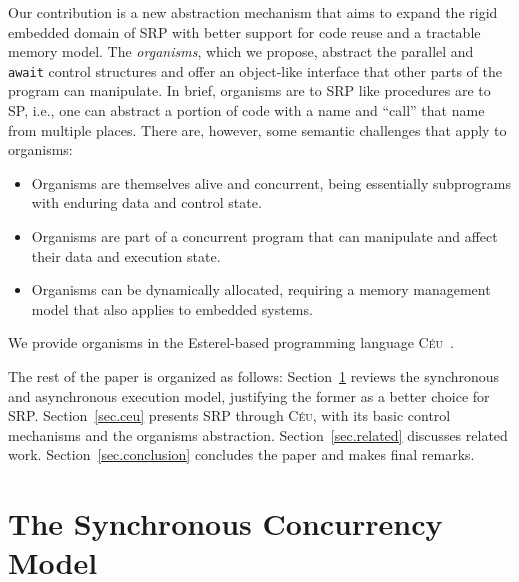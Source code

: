 \documentclass{acm_proc_article-sp}
\newcommand{\CEU}{\textsc{C\'{e}u}\xspace}
\newcommand{\code}[1] {{\small{\texttt{#1}}}}
\newcommand{\1}{\;}
\newcommand{\2}{\;\;}
\newcommand{\3}{\;\;\;}
\newcommand{\5}{\;\;\;\;\;}
\begin{document}
Our contribution is a new abstraction mechanism that aims to expand the rigid 
embedded domain of SRP with better support for code reuse and a tractable 
memory model.
%
The \emph{organisms}, which we propose, abstract the parallel and \code{await} 
control structures and offer an object-like interface that other parts of the 
program can manipulate.
%
In brief, organisms are to SRP like procedures are to SP, i.e., one can 
abstract a portion of code with a name and ``call'' that name from multiple 
places.
%
There are, however, some semantic challenges that apply to organisms:
%
\begin{itemize}
\item Organisms are themselves alive and concurrent, being essentially 
subprograms with enduring data and control state.
\item Organisms are part of a concurrent program that can manipulate and affect 
their data and execution state.
\item Organisms can be dynamically allocated, requiring a memory management 
model that also applies to embedded systems.
\end{itemize}
%
We provide organisms in the Esterel-based programming language 
\CEU~\cite{ceu.sensys13}.
%

The rest of the paper is organized as follows:
Section~\ref{sec.synchronous} reviews the synchronous and asynchronous 
execution model, justifying the former as a better choice for SRP.
Section~\ref{sec.ceu} presents SRP through \CEU, with its basic control 
mechanisms and the organisms abstraction.
Section~\ref{sec.related} discusses related work.
Section~\ref{sec.conclusion} concludes the paper and makes final remarks.

\section{The Synchronous Concurrency Model}
\label{sec.synchronous}
\end{document}
